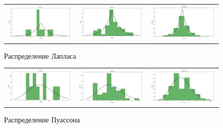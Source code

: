 	\begin{figure}[H]
		\centering
		\begin{tabular}{ccc}
			\includegraphics[width=55mm, height =0.25\textheight]{pics/l10.jpg}
			&
			\includegraphics[width=55mm, height =0.25\textheight]{pics/l50.jpg}
			&
			\includegraphics[width=55mm, height =0.25\textheight]{pics/l1000.jpg}
		\end{tabular}
		\caption{Распределение Лапласа}
		\label{fig:laplace}
	\end{figure}


	\begin{figure}[H]
		\centering
		\begin{tabular}{ccc}
			\includegraphics[width=55mm, height =0.25\textheight]{pics/p10.jpg}
			&
			\includegraphics[width=55mm, height =0.25\textheight]{pics/p50.jpg}
			&
			\includegraphics[width=55mm, height =0.25\textheight]{pics/p1000.jpg}
		\end{tabular}
		\caption{Распределение Пуассона}
		\label{fig:poisson}
	\end{figure}


